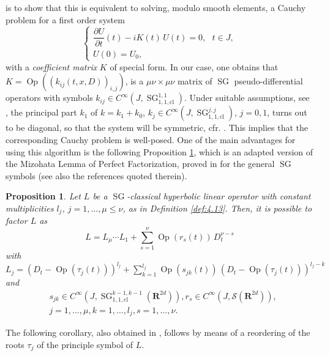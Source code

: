 \documentclass[12pt,a4paper,reqno]{amsart}
\numberwithin{equation}{section}
\numberwithin{thm}{section}
\newtheorem{prop}[thm]{Proposition}
\theoremstyle{definition}
\theoremstyle{remark}
\begin{document}
is to show that this is equivalent to solving, modulo smooth elements, 
a Cauchy problem for a first order system
\[
    \left\{
    \begin{array}{l}
      \dfrac{\partial U}{\partial t}(t) - iK(t)\,U(t)  = 0,
      \mbox{  } t \in J,\\[.3cm]
      U(0) = U_{0},
    \end{array}
    \right.
\]
with a \emph{coefficient matrix} $K$ of special form. In our case, one obtains that
$K = {\operatorname{Op}({(k_{ij}(t,x,D))_{i,j}})}$, is a $\mu\nu \times \mu\nu$ matrix of ${\operatorname{SG}}$ pseudo-differential
operators with symbols $k_{ij} \in C^\infty(J, {\operatorname{SG}}^{1,1}_{1,1,\mathrm{cl}})$.
Under suitable assumptions, see \cite{CoMa, CoPa},
the principal part $k_{1}$ of $k = k_{1} + k_{0}$, $k_{j} \in
C^\infty(J,{\operatorname{SG}}^{j,j}_{1,1,\mathrm{cl}})$, $j=0,1$, turns out to be diagonal, so that the
system will be symmetric, cfr. \cite{Co, coriasco, coriasco2}. This implies that
the corresponding Cauchy problem is well-posed.
One of the main advantages for using
this algorithm is the following Proposition \ref{prop:4bis.2},
which is an adapted version
of the Mizohata Lemma of Perfect Factorization, proved in
\cite{CoRo} for the general ${\operatorname{SG}}$ symbols (see also the references quoted therein).

\begin{prop}
    \label{prop:4bis.2}
    Let $L$ be a ${\operatorname{SG}}$-classical
    hyperbolic linear operator with constant multiplicities
    $l_{j}$, $j=1,\dots,\mu \le \nu$, as in Definition
    \ref{def:4.13}. Then, it is possible to factor $L$ as
        \[
	L = L_{\mu} \cdots L_{1} + \sum_{s=1}^\nu {\operatorname{Op}({r_{s}(t)})} \, D_{t}^{\nu-s}
    \]
        with $L_{j}= (D_{t} - {\operatorname{Op}({\tau_j(t)})})^{l_{j}} + \sum_{k=1}^{l_{j}}
           {\operatorname{Op}({s_{jk}(t)})} \, (D_{t} - {\operatorname{Op}({\tau_j(t)})})^{l_{j}-k}$ and
        \begin{align*}
	&
	s_{jk} \in C^\infty(J, {\operatorname{SG}}^{k-1,k-1}_{1,1,\mathrm{cl}}({\mathbf R^{{2d}}})),
	r_{s} \in C^\infty(J,{{\mathscr S}}({\mathbf R^{{2d}}})),
	\\
	&
	j=1, \dots, \mu, k = 1, \dots, l_{j}, s= 1, \dots, \nu.
    \end{align*}
    \end{prop}
The following corollary, also obtained in \cite{CoRo}, follows by means of a reordering
of the roots $\tau_{j}$ of the principle symbol of $L$.
\end{document}
